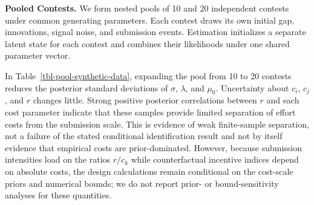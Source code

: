 \documentclass[mnsc]{informs3}
\begin{document}
{\textbf{Pooled Contests.}}
We form nested pools of 10 and 20 independent contests under common generating parameters. Each contest draws its own initial gap, innovations, signal noise, and submission events. Estimation initializes a separate latent state for each contest and combines their likelihoods under one shared parameter vector.

In Table~\ref{tbl-pool-synthetic-data}, expanding the pool from 10 to 20 contests reduces the posterior standard deviations of $\sigma$, $\lambda$, and $\mu_0$. Uncertainty about $c_i$, $c_j$, and $r$ changes little. Strong positive posterior correlations between $r$ and each cost parameter indicate that these samples provide limited separation of effort costs from the submission scale.
{This is evidence of weak finite-sample separation, not a failure of the stated conditional identification result and not by itself evidence that empirical costs are prior-dominated. However, because submission intensities load on the ratios $r/c_k$ while counterfactual incentive indices depend on absolute costs, the design calculations remain conditional on the cost-scale priors and numerical bounds; we do not report prior- or bound-sensitivity analyses for these quantities.}
\end{document}
